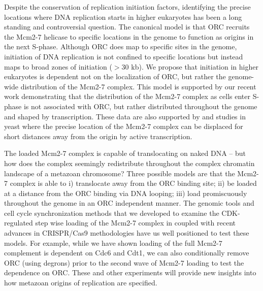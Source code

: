Despite the conservation of replication initiation factors, identifying the precise locations where DNA replication starts in higher eukaryotes has been a long standing and controversial question\citep{Prioleau2016-bj}. The canonical model is that ORC recruits the Mcm2-7 helicase to specific locations in the genome to function as origins in the next S-phase. Although ORC does map to specific sites in the genome\citep{Miotto2016-jt}, initiation of DNA replication is not confined to specific locations but instead maps to broad zones of initiation ($>$30 kb)\citep{Petryk2016-rr}. We propose that initiation in higher eukaryotes is dependent not on the localization of ORC, but rather the genome-wide distribution of the Mcm2-7 complex. This model is supported by our recent work demonstrating that the distribution of the Mcm2-7 complex as \dros cells enter S-phase is not associated with ORC, but rather distributed throughout the genome and shaped by transcription\citep{Powell2015-af}.  These data are also supported by \invitro and \invivo studies in yeast where the precise location of the Mcm2-7 complex can be displaced for short distances away from the origin by active transcription\citep{Gros2015-oo}.  

The loaded Mcm2-7 complex is capable of translocating on naked DNA -- but how does the complex seemingly redistribute throughout the complex chromatin landscape of a metazoan chromosome?  Three possible models are that the Mcm2-7 complex is able to i) translocate away from the ORC binding site; ii) be loaded at a distance from the ORC binding via DNA looping; iii) load promiscuously throughout the genome in an ORC independent manner\citep{Shibata2016-uc}.  The genomic tools and cell cycle synchronization methods that we developed to examine the CDK-regulated step wise loading of the Mcm2-7 complex in \dros coupled with recent advances in CRISPR/Cas9 methodologies\citep{Kunzelmann2016-sf} have us well positioned to test these models.  For example, while we have shown loading of the full Mcm2-7 complement is dependent on Cdc6 and Cdt1\citep{Powell2015-af}, we can also conditionally remove ORC (using degrons) prior to the second wave of Mcm2-7 loading to test the dependence on ORC.  These and other experiments will provide new insights into how metazoan origins of replication are specified.   

